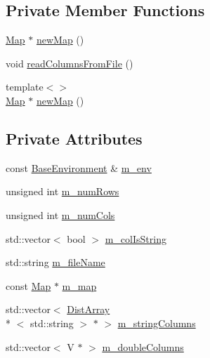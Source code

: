 \subsection*{Private Member Functions}
\begin{DoxyCompactItemize}
\item 
\hyperlink{class_q_u_e_s_o_1_1_map}{Map} $\ast$ \hyperlink{class_q_u_e_s_o_1_1_ascii_table_aa42459bf69563f6606103c5f6da60a5a}{new\-Map} ()
\item 
void \hyperlink{class_q_u_e_s_o_1_1_ascii_table_a008557a6d782f76a51e72c77b3136322}{read\-Columns\-From\-File} ()
\item 
{\footnotesize template$<$$>$ }\\\hyperlink{class_q_u_e_s_o_1_1_map}{Map} $\ast$ \hyperlink{class_q_u_e_s_o_1_1_ascii_table_abb01e65369e9ad3e43e788d8ed2d2415}{new\-Map} ()
\end{DoxyCompactItemize}
\subsection*{Private Attributes}
\begin{DoxyCompactItemize}
\item 
const \hyperlink{class_q_u_e_s_o_1_1_base_environment}{Base\-Environment} \& \hyperlink{class_q_u_e_s_o_1_1_ascii_table_a2ba907db652aa02d53d493980d7a3753}{m\-\_\-env}
\item 
unsigned int \hyperlink{class_q_u_e_s_o_1_1_ascii_table_a4f772a7719d36cb0a0908eed37bd1deb}{m\-\_\-num\-Rows}
\item 
unsigned int \hyperlink{class_q_u_e_s_o_1_1_ascii_table_ada886c8db06d2d618f2898ad2cf2bd87}{m\-\_\-num\-Cols}
\item 
std\-::vector$<$ bool $>$ \hyperlink{class_q_u_e_s_o_1_1_ascii_table_a1c84e461d75e0846c156617f222c2ec3}{m\-\_\-col\-Is\-String}
\item 
std\-::string \hyperlink{class_q_u_e_s_o_1_1_ascii_table_adb7e4bac907ef1c93d745f02ea9f15d2}{m\-\_\-file\-Name}
\item 
const \hyperlink{class_q_u_e_s_o_1_1_map}{Map} $\ast$ \hyperlink{class_q_u_e_s_o_1_1_ascii_table_a7771fe0a08a93abdeadcc5e55e350eea}{m\-\_\-map}
\item 
std\-::vector$<$ \hyperlink{class_q_u_e_s_o_1_1_dist_array}{Dist\-Array}\\*
$<$ std\-::string $>$ $\ast$ $>$ \hyperlink{class_q_u_e_s_o_1_1_ascii_table_a14ba55d29e9a4ddeb14cd5acd8a27268}{m\-\_\-string\-Columns}
\item 
std\-::vector$<$ V $\ast$ $>$ \hyperlink{class_q_u_e_s_o_1_1_ascii_table_aa25a1d14c88cd5de341c43e052622f51}{m\-\_\-double\-Columns}
\end{DoxyCompactItemize}


